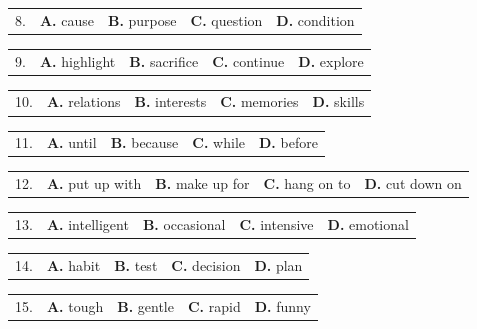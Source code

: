 \documentclass[UTF8,11pt]{ctexart}
\begin{document}
\noindent\begin{tabularx}{\linewidth}{@{}lXXXX@{}}8. & \textbf{A.} cause & \textbf{B.} purpose & \textbf{C.} question & \textbf{D.} condition\\\end{tabularx}\par

\noindent\begin{tabularx}{\linewidth}{@{}lXXXX@{}}9. & \textbf{A.} highlight & \textbf{B.} sacrifice & \textbf{C.} continue & \textbf{D.} explore\\\end{tabularx}\par

\noindent\begin{tabularx}{\linewidth}{@{}lXXXX@{}}10. & \textbf{A.} relations & \textbf{B.} interests & \textbf{C.} memories & \textbf{D.} skills\\\end{tabularx}\par

\noindent\begin{tabularx}{\linewidth}{@{}lXXXX@{}}11. & \textbf{A.} until & \textbf{B.} because & \textbf{C.} while & \textbf{D.} before\\\end{tabularx}\par

\noindent\begin{tabularx}{\linewidth}{@{}lXXXX@{}}12. & \textbf{A.} put up with & \textbf{B.} make up for & \textbf{C.} hang on to & \textbf{D.} cut down on\\\end{tabularx}\par

\noindent\begin{tabularx}{\linewidth}{@{}lXXXX@{}}13. & \textbf{A.} intelligent & \textbf{B.} occasional & \textbf{C.} intensive & \textbf{D.} emotional\\\end{tabularx}\par

\noindent\begin{tabularx}{\linewidth}{@{}lXXXX@{}}14. & \textbf{A.} habit & \textbf{B.} test & \textbf{C.} decision & \textbf{D.} plan\\\end{tabularx}\par

\noindent\begin{tabularx}{\linewidth}{@{}lXXXX@{}}15. & \textbf{A.} tough & \textbf{B.} gentle & \textbf{C.} rapid & \textbf{D.} funny\\\end{tabularx}\par
\end{document}
